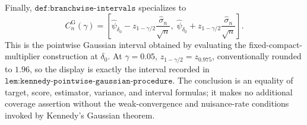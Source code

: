 Finally, \(\texttt{def:branchwise-intervals}\) specializes to
\[
C_n^{\mathrm G}(\gamma)
=\left[
\widehat\psi_{\delta_0}
-z_{1-\gamma/2}\frac{\widehat\sigma_n}{\sqrt n},\;
\widehat\psi_{\delta_0}
+z_{1-\gamma/2}\frac{\widehat\sigma_n}{\sqrt n}
\right].
\]
This is the pointwise Gaussian interval obtained by evaluating the
fixed-compact-multiplier construction at \(\delta_0\).  At
\(\gamma=0.05\), \(z_{1-\gamma/2}=z_{0.975}\), conventionally rounded to
\(1.96\), so the display is exactly the interval recorded in
\(\texttt{lem:kennedy-pointwise-gaussian-procedure}\).  The conclusion is
an equality of target, score, estimator, variance, and interval formulas;
it makes no additional coverage assertion without the weak-convergence
and nuisance-rate conditions invoked by Kennedy's Gaussian theorem.
